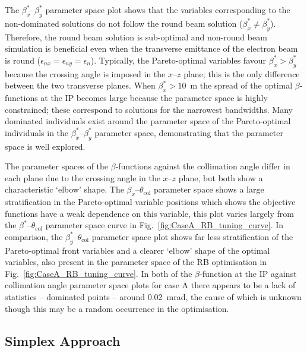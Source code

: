 \documentclass[../main.tex]{subfiles}
\begin{document}
The $\beta_{x}^{*}$--$\beta_{y}^{*}$ parameter space plot shows that the variables corresponding to the non-dominated solutions do not follow the round beam solution ($\beta_{x}^{*}\neq\beta_{y}^{*}$). Therefore, the round beam solution is sub-optimal and non-round beam simulation is beneficial even when the transverse emittance of the electron beam is round ($\epsilon_{nx}=\epsilon_{ny}=\epsilon_{n}$). Typically, the Pareto-optimal variables favour $\beta_{x}^{*}>\beta_{y}^{*}$ because the crossing angle is imposed in the $x$--$z$ plane; this is the only difference between the two transverse planes. When $\beta_{x}^{*}>10$~\si{\meter} the spread of the optimal $\beta$-functions at the IP becomes large because the parameter space is highly constrained; these correspond to solutions for the narrowest bandwidths. Many dominated individuals exist around the parameter space of the Pareto-optimal individuals in the $\beta_{x}^{*}$--$\beta_{y}^{*}$ parameter space, demonstrating that the parameter space is well explored.

The parameter spaces  of the $\beta$-functions against the collimation angle differ in each plane due to the crossing angle in the $x$--$z$ plane, but both show a characteristic `elbow' shape. The $\beta_{x}$--$\theta_{\mathrm{col}}$ parameter space shows a large stratification in the Pareto-optimal variable positions which shows the objective functions have a weak dependence on this variable, this plot varies largely from the $\beta^{*}$--$\theta_{\mathrm{col}}$ parameter space curve in Fig.~\ref{fig:CaseA_RB_tuning_curve}. In comparison, the $\beta_{y}^{*}$--$\theta_{\mathrm{col}}$ parameter space plot shows far less stratification of the Pareto-optimal front variables and a clearer `elbow' shape of the optimal variables, also present in the parameter space of the RB optimisation in Fig.~\ref{fig:CaseA_RB_tuning_curve}. In both of the $\beta$-function at the IP against collimation angle parameter space plots for case A there appears to be a lack of statistics -- dominated points -- around 0.02~\si{\milli\radian}, the cause of which is unknown though this may be a random occurrence in the optimisation.    

\subsection{Simplex Approach}
\label{sec:simplex_optimisation}
\end{document}
